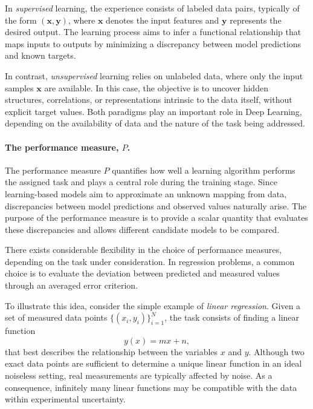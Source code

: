 In \emph{supervised} learning, the experience consists of labeled data pairs, typically of the form $(\mathbf{x}, \mathbf{y})$, where $\mathbf{x}$ denotes the input features and $\mathbf{y}$ represents the desired output. The learning process aims to infer a functional relationship that maps inputs to outputs by minimizing a discrepancy between model predictions and known targets.

In contrast, \emph{unsupervised} learning relies on unlabeled data, where only the input samples $\mathbf{x}$ are available. In this case, the objective is to uncover hidden structures, correlations, or representations intrinsic to the data itself, without explicit target values. Both paradigms play an important role in Deep Learning, depending on the availability of data and the nature of the task being addressed.

\paragraph{The performance measure, $P$.}
The performance measure $P$ quantifies how well a learning algorithm performs the assigned task and plays a central role during the training stage. Since learning-based models aim to approximate an unknown mapping from data, discrepancies between model predictions and observed values naturally arise. The purpose of the performance measure is to provide a scalar quantity that evaluates these discrepancies and allows different candidate models to be compared.

There exists considerable flexibility in the choice of performance measures, depending on the task under consideration. In regression problems, a common choice is to evaluate the deviation between predicted and measured values through an averaged error criterion.

To illustrate this idea, consider the simple example of \emph{linear regression}. Given a set of measured data points $\{(x_i, y_i)\}_{i=1}^N$, the task consists of finding a linear function
\begin{equation}
    y(x) = m x + n,
\end{equation}
that best describes the relationship between the variables $x$ and $y$. Although two exact data points are sufficient to determine a unique linear function in an ideal noiseless setting, real measurements are typically affected by noise. As a consequence, infinitely many linear functions may be compatible with the data within experimental uncertainty.

